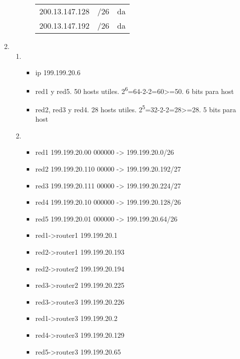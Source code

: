 \documentclass[11pt]{article}
\begin{document}
\begin{enumerate}
\begin{enumerate}
\begin{enumerate}
\begin{center}
\begin{tabular}{rll}
200.13.147.128 & /26 & da\\
200.13.147.192 & /26 & da\\
\end{tabular}
\end{center}
\end{enumerate}
\end{enumerate}
\item \begin{enumerate}
\item \begin{itemize}
\item ip 199.199.20.6
\item red1 y red5. 50 hosts utiles. 2\textsuperscript{6}=64-2-2=60>=50. 6 bits para host
\item red2, red3 y red4. 28 hosts utiles. 2\textsuperscript{5}=32-2-2=28>=28. 5 bits para host
\end{itemize}
\item \begin{itemize}
\item red1 199.199.20.00  000000 -> 199.199.20.0/26
\item red2 199.199.20.110 00000  -> 199.199.20.192/27
\item red3 199.199.20.111 00000  -> 199.199.20.224/27
\item red4 199.199.20.10  000000 -> 199.199.20.128/26
\item red5 199.199.20.01  000000 -> 199.199.20.64/26
\item red1->router1 199.199.20.1
\item red2->router1 199.199.20.193
\item red2->router2 199.199.20.194
\item red3->router2 199.199.20.225
\item red3->router3 199.199.20.226
\item red1->router3 199.199.20.2
\item red4->router3 199.199.20.129
\item red5->router3 199.199.20.65
\end{itemize}
\end{enumerate}
\end{enumerate}
\end{document}
